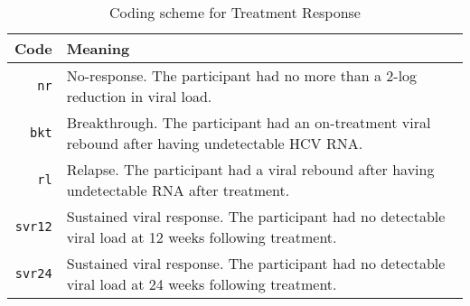 \begin{table}[h]
  \caption{Coding scheme for Treatment Response}
  \label{tbl:treatment-response}
  \begin{tabular}{rp{8cm}}
    Code                & Meaning \\ \hline
    \texttt{nr}         & No-response. The participant had no more than a 2-log reduction in viral load. \\
    \texttt{bkt}        & Breakthrough. The participant had an on-treatment viral rebound after having undetectable HCV RNA. \\
    \texttt{rl}         & Relapse. The participant had a viral rebound after having undetectable RNA after treatment. \\
    \texttt{svr12}      & Sustained viral response. The participant had no detectable viral load at 12 weeks following treatment. \\
    \texttt{svr24}      & Sustained viral response. The participant had no detectable viral load at 24 weeks following treatment. \\
  \end{tabular}
\end{table}

